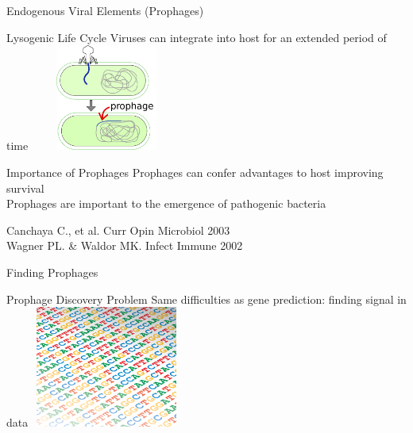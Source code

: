 \documentclass[11pt, xcolor=table]{beamer}
\begin{document}
	\begin{frame}{Endogenous Viral Elements (Prophages)}
	\begin{block}{Lysogenic Life Cycle}
	Viruses can integrate into host for an extended period of time
	\center
	\vspace{-0.2cm}
	\includegraphics[height=3.5cm, width=5cm]{prophage.png}
	\end{block}
	\begin{block}{Importance of Prophages}
	Prophages can confer advantages to host improving survival \\ 
	Prophages are important to the emergence of pathogenic bacteria
	\end{block}
	
	\tiny{Canchaya C., et al. Curr Opin Microbiol 2003 \\ Wagner PL. \& Waldor MK. Infect Immune 2002}
	\end{frame}
	\begin{frame}{Finding Prophages}
	\begin{block}{Prophage Discovery Problem}
	Same difficulties as gene prediction: finding signal in data
	\center
	\includegraphics[height=4cm, width=5cm]{dna.png}
	\end{block}
	\end{frame}
\end{document}
